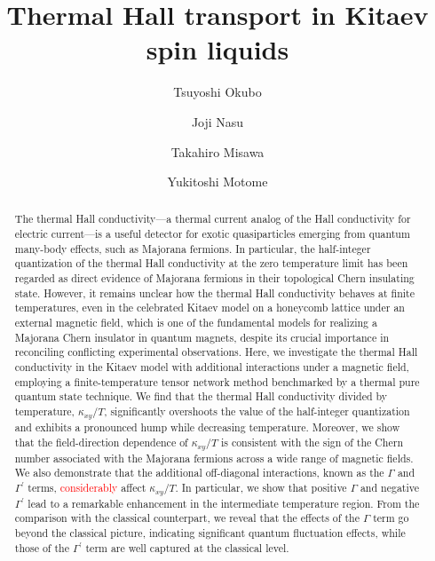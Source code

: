 \documentclass[twocolumn,superscriptaddress,showpacs, longbibliography, aps, prx]{revtex4-2}
\newcommand{\red}[1]{\textcolor{red}{#1}}
\begin{document}
\title{Thermal Hall transport in Kitaev spin liquids}
\author{Tsuyoshi Okubo}
\author{Joji Nasu}
\author{Takahiro Misawa}
\author{Yukitoshi Motome}

\begin{abstract}
The thermal Hall conductivity---a thermal current analog of the Hall conductivity for electric current---is a useful detector for exotic quasiparticles emerging from quantum many-body effects, such as Majorana fermions.
In particular, the half-integer quantization of the thermal Hall conductivity at the zero temperature limit has been regarded as direct evidence of Majorana fermions in their topological Chern insulating state. 
However, it remains unclear how the thermal Hall conductivity behaves at finite temperatures, even in the celebrated Kitaev model on a honeycomb lattice under an external magnetic field, which is one of the fundamental models for realizing a Majorana Chern insulator in quantum magnets, despite its crucial importance in reconciling conflicting experimental observations. 
Here, we investigate the thermal Hall conductivity in the Kitaev model with additional interactions under a magnetic field, employing a finite-temperature tensor network method benchmarked by a thermal pure quantum state technique. 
We find that the thermal Hall conductivity divided by temperature, $\kappa_{xy}/T$, significantly overshoots the value of the half-integer quantization and exhibits a pronounced hump while decreasing temperature. 
Moreover, we show that the field-direction dependence of $\kappa_{xy}/T$ is consistent with the sign of the Chern number associated with the Majorana fermions across a wide range of magnetic fields. 
We also demonstrate that the additional off-diagonal interactions, known as the $\Gamma$ and $\Gamma^{\prime}$ terms, %
\red{considerably} affect $\kappa_{xy}/T$. 
In particular, we show that positive $\Gamma$ and negative $\Gamma^{\prime}$ lead to a remarkable enhancement in the intermediate temperature region. 
From the comparison with the classical counterpart, we reveal that the effects of the $\Gamma$ term go beyond the classical picture, indicating significant quantum fluctuation effects, while those of the $\Gamma^\prime$ term are well captured at the classical level. 

\end{abstract}
\end{document}
